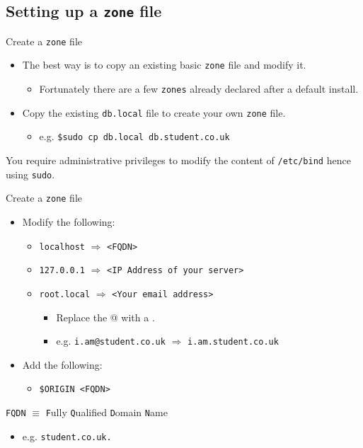 \documentclass[xcolor=table]{beamer}
\begin{document}
\subsection{Setting up a \texttt{zone} file}
\begin{frame}{Create a \texttt{zone} file}
  \begin{itemize}
    \item The best way is to copy an existing basic \texttt{zone} file and modify it.
      \begin{itemize}
        \item Fortunately there are a few \texttt{zones} already declared after a default install.
      \end{itemize}
  \item Copy the existing \texttt{db.local} file to create your own \texttt{zone} file.
    \begin{itemize}
      \item e.g. \texttt{\$sudo cp db.local db.student.co.uk}
    \end{itemize}
  \end{itemize}
  \begin{tcolorbox}[title={\textbf{NOTE:}}]
    You require administrative privileges to modify the content of \texttt{/etc/bind} hence using \texttt{sudo}.
  \end{tcolorbox}
\end{frame}

\begin{frame}{Create a \texttt{zone} file}
  \begin{itemize}
    \item Modify the following:
      \begin{itemize}
        \item \texttt{localhost} $\Longrightarrow$ \texttt{<FQDN>}
        \item \texttt{127.0.0.1} $\Longrightarrow$ \texttt{<IP Address of your server>}
        \item \texttt{root.local} $\Longrightarrow$ \texttt{<Your email address>}
          \begin{itemize}
            \item Replace the @ with a . 
            \item e.g. \texttt{i.am@student.co.uk} $\Longrightarrow$ \texttt{i.am.student.co.uk}
          \end{itemize}
      \end{itemize}
      \item Add the following:
        \begin{itemize}
          \item \texttt{\$ORIGIN <FQDN>}
        \end{itemize}
  \end{itemize}
  \begin{tcolorbox}[title={\textbf{NOTE:}}]
    \texttt{FQDN} $\equiv$ \texttt{F}ully \texttt{Q}ualified \texttt{D}omain \texttt{N}ame
    \begin{itemize}
      \item e.g. \texttt{student.co.uk.}
    \end{itemize}
  \end{tcolorbox}
\end{frame}
\end{document}
